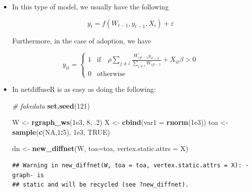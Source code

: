 \documentclass[
]{book}
\newenvironment{Shaded}{\begin{snugshade}}{\end{snugshade}}
\newcommand{\AttributeTok}[1]{\textcolor[rgb]{0.13,0.29,0.53}{#1}}
\newcommand{\CommentTok}[1]{\textcolor[rgb]{0.56,0.35,0.01}{\textit{#1}}}
\newcommand{\ConstantTok}[1]{\textcolor[rgb]{0.56,0.35,0.01}{#1}}
\newcommand{\DecValTok}[1]{\textcolor[rgb]{0.00,0.00,0.81}{#1}}
\newcommand{\FloatTok}[1]{\textcolor[rgb]{0.00,0.00,0.81}{#1}}
\newcommand{\FunctionTok}[1]{\textcolor[rgb]{0.13,0.29,0.53}{\textbf{#1}}}
\newcommand{\NormalTok}[1]{#1}
\newcommand{\OtherTok}[1]{\textcolor[rgb]{0.56,0.35,0.01}{#1}}
\newcommand{\SpecialCharTok}[1]{\textcolor[rgb]{0.81,0.36,0.00}{\textbf{#1}}}
\newcommand{\StringTok}[1]{\textcolor[rgb]{0.31,0.60,0.02}{#1}}
\begin{document}
\begin{itemize}
\item
  In this type of model, we usually have the following

  \[
  y_t = f(W_{t-1}, y_{t-1}, X_i) + \varepsilon
  \]

  Furthermore, in the case of adoption, we have

  \[
  y_{it} = \left\{
  \begin{array}{ll}
  1 & \mbox{if}\quad \rho\sum_{j\neq i}\frac{W_{ijt-1}y_{it-1}}{\sum_{j\neq i}W_{ijt-1}} + X_{it}\beta > 0\\
  0 & \mbox{otherwise}
  \end{array}
  \right.
  \]
\item
  In netdiffuseR is as easy as doing the following:

\begin{Shaded}
\begin{Highlighting}[]
\CommentTok{\# fakedata}
\FunctionTok{set.seed}\NormalTok{(}\DecValTok{121}\NormalTok{)}

\NormalTok{W   }\OtherTok{\textless{}{-}} \FunctionTok{rgraph\_ws}\NormalTok{(}\FloatTok{1e3}\NormalTok{, }\DecValTok{8}\NormalTok{, .}\DecValTok{2}\NormalTok{)}
\NormalTok{X   }\OtherTok{\textless{}{-}} \FunctionTok{cbind}\NormalTok{(}\AttributeTok{var1 =} \FunctionTok{rnorm}\NormalTok{(}\FloatTok{1e3}\NormalTok{))}
\NormalTok{toa }\OtherTok{\textless{}{-}} \FunctionTok{sample}\NormalTok{(}\FunctionTok{c}\NormalTok{(}\ConstantTok{NA}\NormalTok{,}\DecValTok{1}\SpecialCharTok{:}\DecValTok{5}\NormalTok{), }\FloatTok{1e3}\NormalTok{, }\ConstantTok{TRUE}\NormalTok{)}

\NormalTok{dn  }\OtherTok{\textless{}{-}} \FunctionTok{new\_diffnet}\NormalTok{(W, }\AttributeTok{toa=}\NormalTok{toa, }\AttributeTok{vertex.static.attrs =}\NormalTok{ X)}
\end{Highlighting}
\end{Shaded}

\begin{verbatim}
## Warning in new_diffnet(W, toa = toa, vertex.static.attrs = X): -graph- is
## static and will be recycled (see ?new_diffnet).
\end{verbatim}

\begin{Shaded}
\end{Shaded}
\end{itemize}
\end{document}
